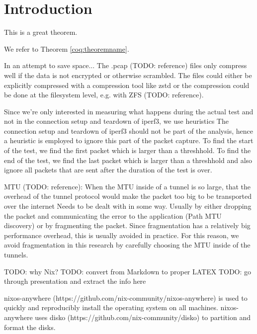 
\chapter{Introduction}


\begin{theorem}[Test][theoremname]
  This is a great theorem.
\end{theorem}

We refer to Theorem \ref{coq:theoremname}.

In an attempt to save space...
The .pcap (TODO: reference) files only compress well if the data is not encrypted or otherwise scrambled.
The files could either be explicitly compressed with a compression tool like zstd or the compression could be done at the filesystem level, e.g. with ZFS (TODO: reference).


Since we're only interested in measuring what happens during the actual test and not in the connection setup and teardown of iperf3, we use heuristics
The connection setup and teardown of iperf3 should not be part of the analysis, hence a heuristic is employed to ignore this part of the packet capture. To find the start of the test, we find the first packet which is larger than a threshhold. To find the end of the test, we find the last packet which is larger than a threshhold and also ignore all packets that are sent after the duration of the test is over.

MTU (TODO: reference):
When the MTU inside of a tunnel is so large, that the overhead of the tunnel protocol would make the packet too big to be transported over the internet
Needs to be dealt with in some way. Usually by either dropping the packet and communicating the error to the application (Path MTU discovery) or by fragmenting the packet. Since fragmentation has a relatively big performance overhead, this is usually avoided in practice. For this reason, we avoid fragmentation in this research by carefully choosing the MTU inside of the tunnels.

TODO: why Nix?
TODO: convert from Markdown to proper LATEX
TODO: go through presentation and extract the info here

nixos-anywhere (https://github.com/nix-community/nixos-anywhere) is used to quickly and reproducibly install the operating system on all machines.
nixos-anywhere uses disko (https://github.com/nix-community/disko) to partition and format the disks.


